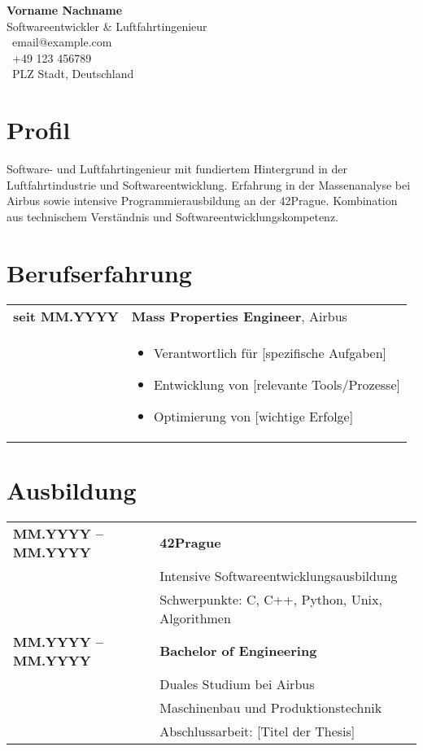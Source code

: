 \documentclass[a4paper,11pt]{article}
\newcommand{\cvheader}[5]{
    \begin{minipage}[t]{0.7\textwidth}
        {\LARGE\textbf{#1}}\\[0.3em]
        {\large #2}\\[0.3em]
        \faEnvelope\ #3\\
        \faPhone\ #4\\
        \faMapMarker\ #5
    \end{minipage}
    \begin{minipage}[t]{0.3\textwidth}
        \raggedleft
        \framebox[3.5cm]{\parbox[t][4.5cm]{3.5cm}{\centering Foto}}
    \end{minipage}
}
\begin{document}
\cvheader{Vorname Nachname}
{Softwareentwickler \& Luftfahrtingenieur}
{email@example.com}
{+49 123 456789}
{PLZ Stadt, Deutschland}

\vspace{1cm}

\section{Profil}
\vspace{0.3cm}
Software- und Luftfahrtingenieur mit fundiertem Hintergrund in der Luftfahrtindustrie und Softwareentwicklung. Erfahrung in der Massenanalyse bei Airbus sowie intensive Programmierausbildung an der 42Prague. Kombination aus technischem Verständnis und Softwareentwicklungskompetenz.

\section{Berufserfahrung}
\vspace{0.3cm}
\begin{tabularx}{\textwidth}{@{}p{4.2cm}@{}X@{}}
\textbf{seit MM.YYYY} & \textbf{Mass Properties Engineer}, Airbus\\
& \begin{itemize}[leftmargin=*,nosep]
  \item Verantwortlich für [spezifische Aufgaben]
  \item Entwicklung von [relevante Tools/Prozesse]
  \item Optimierung von [wichtige Erfolge]
\end{itemize}\\[0.2cm]
\end{tabularx}

\section{Ausbildung}
\vspace{0.3cm}
\begin{tabularx}{\textwidth}{@{}p{4.2cm}@{}X@{}}
\textbf{MM.YYYY -- MM.YYYY} & \textbf{42Prague}\\
& Intensive Softwareentwicklungsausbildung\\
& Schwerpunkte: C, C++, Python, Unix, Algorithmen\\[0.2cm]

\textbf{MM.YYYY -- MM.YYYY} & \textbf{Bachelor of Engineering}\\
& Duales Studium bei Airbus\\
& Maschinenbau und Produktionstechnik\\
& Abschlussarbeit: [Titel der Thesis]
\end{tabularx}
\end{document}
